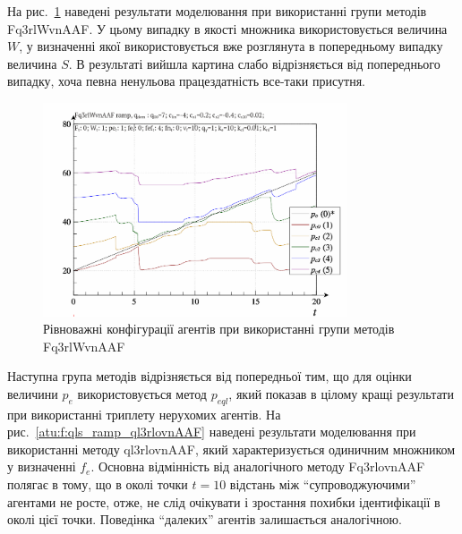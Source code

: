 На рис.~\ref{atu:f:qls_ramp_Fq3rlWvnAAF} наведені результати моделювання при
використанні групи методів Fq3rlWvnAAF. У цьому випадку в якості множника
використовується величина
$W$, у визначенні якої використовується вже розглянута в
попередньому випадку величина
$S$. В результаті вийшла картина слабо відрізняється від
попереднього випадку, хоча певна ненульова працездатність
все-таки присутня.

\begin{figure}[htb!]
  \begin{center}
    \includegraphics[width=0.8\textwidth]{p/ramp/qls-p_t_pi_Fq3rlWvnAAF_ramp.png}
  \end{center}
  \caption{Рівноважні конфігурації агентів при використанні групи методів Fq3rlWvnAAF}
  \label{atu:f:qls_ramp_Fq3rlWvnAAF}
\end{figure}

Наступна група методів відрізняється від попередньої тим, що
для оцінки величини
$p_e$ використовується метод
$p_{eql}$, який показав в цілому кращі результати при використанні
триплету нерухомих агентів. На рис.~\ref{atu:f:qls_ramp_ql3rlovnAAF} наведені
результати моделювання при використанні методу ql3rlovnAAF, який
характеризується одиничним множником у визначенні
$f_e$. Основна відмінність від аналогічного методу Fq3rlovnAAF полягає
в тому, що в околі точки
$t = 10$ відстань між ``супроводжуючими'' агентами не росте, отже, не
слід очікувати і зростання похибки ідентифікації в околі цієї
точки. Поведінка ``далеких'' агентів залишається аналогічною.


